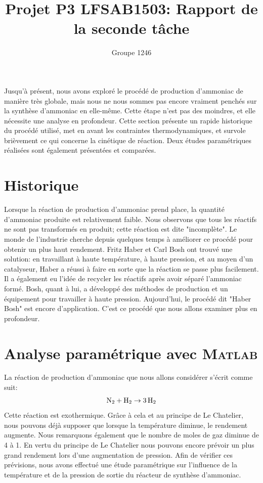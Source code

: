 \documentclass[11pt,a4paper]{report}
\author{Groupe 1246}
\title{Projet P3 LFSAB1503: Rapport de la seconde tâche}
\begin{document}
\maketitle


Jusqu'à présent, nous avons exploré le procédé de production d'ammoniac de manière très globale, mais nous ne nous 
sommes pas encore vraiment penchés sur la synthèse d'ammoniac en elle-même. Cette étape n'est pas des moindres, et 
elle nécessite une analyse en profondeur. Cette section présente un rapide historique du procédé utilisé, met en 
avant les contraintes thermodynamiques, et survole brièvement ce qui concerne la cinétique de réaction. Deux études
paramétriques réalisées sont également présentées et comparées.

\section{Historique}

Lorsque la réaction de production d'ammoniac prend place, la quantité d'ammoniac produite est relativement faible. 
Nous observons que tous les réactifs ne sont pas transformés en produit; cette réaction est dite "incomplète". 
Le monde de l'industrie cherche depuis quelques temps à améliorer ce procédé pour obtenir un plus haut rendement. 
Fritz Haber et Carl Bosh ont trouvé une solution: en travaillant à haute température, à haute pression, et au moyen 
d'un catalyseur, Haber a réussi à faire en sorte que la réaction se passe plus facilement. Il a également eu l'idée 
de recycler les réactifs après avoir séparé l'ammoniac formé. Bosh, quant à lui, a développé des méthodes de 
production et un équipement pour travailler à haute pression. Aujourd'hui, le procédé dit "Haber Bosh" est encore 
d'application. C'est ce procédé que nous allons examiner plus en profondeur.

\section{Analyse paramétrique avec \textsc{Matlab}}

La réaction de production d'ammoniac que nous allons considérer s'écrit comme suit:
$$\ce{N2} + \ce{H2} \rightarrow \ce{3H2}$$
Cette réaction est exothermique. Grâce à cela et au principe de Le Chatelier, nous pouvons déjà supposer que lorsque 
la température diminue, le rendement augmente. Nous remarquons également que le nombre de moles de gaz diminue de 4 à
1. En vertu du principe de Le Chatelier nous pouvons encore prévoir un plus grand rendement lors d'une augmentation de 
pression.
Afin de vérifier ces prévisions, nous avons effectué une étude paramétrique sur l'influence de la température et de la
pression de sortie du réacteur de synthèse d'ammoniac.
\end{document}
